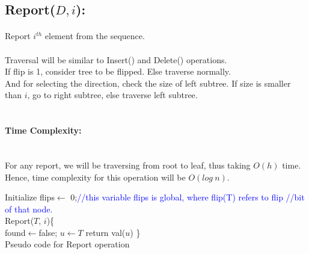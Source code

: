 \documentclass[pdftex,a4paper,12pt]{report}
\begin{document}
\newpage
\subsection{Report($D, i$):} 
\paragraph{} Report $i^{th}$ element from the sequence.\\\\
Traversal will be similar to Insert() and Delete() operations.\\
If flip is 1, consider tree to be flipped. Else traverse normally.\\
And for selecting the direction, check the size of left subtree. If size is smaller than $i$, go to 
right subtree, else traverse left subtree.\\\\

\paragraph{Time Complexity:} \makebox[2pt]{}\\
For any report, we will be traversing from root to leaf, thus taking $O(h)$ time. Hence, time complexity for this operation will
be $O(log\ n)$.
\begin{algorithm}
Initialize flips$\gets$ 0;\makebox[40pt]{}\textcolor{blue}{//this variable flips is global, where flip(T) refers to
 flip \makebox[150pt]{}//bit of that node.}\\
Report($T$, $i$)\{\\
		found$\gets$false; $u\gets T$\;
		return val($u$)\;
\}\\
\caption{Pseudo code for Report operation}
\end{algorithm}
\end{document}
